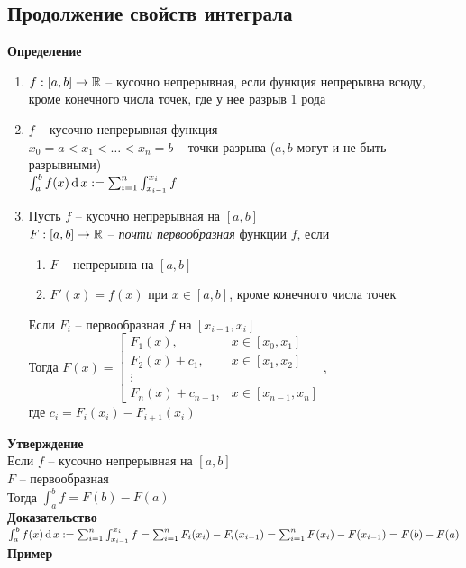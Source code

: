 \documentclass[12pt]{article}
\begin{document}
\subsection{Продолжение свойств интеграла}
\textbf{Определение}\\
\begin{enumerate}
    \item $f: [a,b] \rightarrow \mathbb{R}$ -- кусочно непрерывная, если функция непрерывна всюду, кроме конечного числа точек, где у нее разрыв 1 рода
    \item $f$ -- кусочно непрерывная функция\\
    $x_0 = a < x_1 < \ldots < x_n = b$ -- точки разрыва ($a,b$ могут и не быть разрывными)\\
    $\int_a^b f(x)\operatorname{d} x := \sum_{i=1}^n\int_{x_{i-1}}^{x_i} f$
    \item Пусть $f$ -- кусочно непрерывная на $[a,b]$\\
    $F:[a,b] \rightarrow \mathbb{R}$ -- \textit{почти первообразная} функции $f$, если\\
    \begin{enumerate}
        \item $F$ -- непрерывна на $[a,b]$
        \item $F'(x) = f(x)$ при $x \in [a,b]$, кроме конечного числа точек
    \end{enumerate}
    Если $F_i$ -- первообразная $f$ на $[x_{i-1}, x_i]$\\
    Тогда $F(x) = \left[\begin{array}{ll}
         F_1(x),& x \in [x_0, x_1]\\
         F_2(x) + c_1,& x \in [x_1, x_2]\\
         \vdots\\
         F_n(x) + c_{n-1}, & x\in [x_{n-1}, x_n]
    \end{array}\right.$,\\
    где $c_i = F_i(x_i) - F_{i+1}(x_i)$
\end{enumerate}
\textbf{Утверждение}\\
Если $f$ -- кусочно непрерывная на $[a,b]$\\
$F$ -- первообразная\\
Тогда $\int_a^b f = F(b) - F(a)$\\
\textbf{Доказательство}\\
$\int_a^b f(x)\operatorname{d} x := \sum_{i=1}^n\int_{x_{i-1}}^{x_i} f = \sum_{i=1}^n F_i(x_i) - F_i(x_{i-1}) = \sum_{i=1}^n F(x_i) - F(x_{i-1}) = F(b) - F(a)$\\
\textbf{Пример}\\
\end{document}

